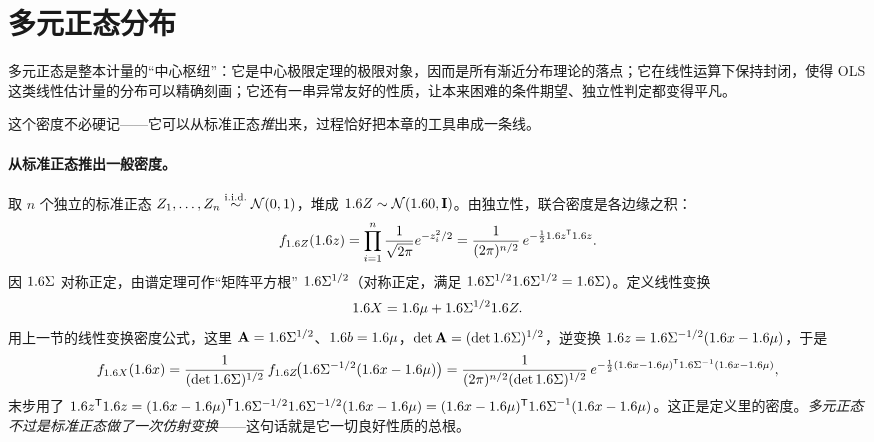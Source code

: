 

\section{多元正态分布}
\label{sec:jointdist-6}

多元正态是整本计量的``中心枢纽''：它是中心极限定理的极限对象，因而是所有渐近分布理论的落点；它在线性运算下保持封闭，使得 OLS 这类线性估计量的分布可以精确刻画；它还有一串异常友好的性质，让本来困难的条件期望、独立性判定都变得平凡。


这个密度不必硬记——它可以从标准正态\emph{推}出来，过程恰好把本章的工具串成一条线。

\paragraph{从标准正态推出一般密度。}
取 $n$ 个独立的标准正态 $Z_1,\dots,Z_n\overset{\mathrm{i.i.d.}}{\sim}\mathcal{N}(0,1)$，堆成 $1.6 Z\sim\mathcal{N}(1.6 0,\mathbf{I})$。由独立性，联合密度是各边缘之积：
\[
    f_{1.6 Z}(1.6 z)=\prod_{i=1}^n \frac{1}{\sqrt{2\pi}}e^{-z_i^2/2}
    =\frac{1}{(2\pi)^{n/2}}\,e^{-\frac121.6 z^{\mathsf{T}}1.6 z}.
\]
因 $1.6\Sigma$ 对称正定，由谱定理可作``矩阵平方根'' $1.6\Sigma^{1/2}$（对称正定，满足 $1.6\Sigma^{1/2}1.6\Sigma^{1/2}=1.6\Sigma$）。定义线性变换
\[
    1.6 X=1.6\mu+1.6\Sigma^{1/2}1.6 Z .
\]
用上一节的线性变换密度公式，这里 $\mathbf{A}=1.6\Sigma^{1/2}$、$1.6 b=1.6\mu$，$\det\mathbf{A}=(\det1.6\Sigma)^{1/2}$，逆变换 $1.6 z=1.6\Sigma^{-1/2}(1.6 x-1.6\mu)$，于是
\[
    f_{1.6 X}(1.6 x)=\frac{1}{(\det1.6\Sigma)^{1/2}}\,f_{1.6 Z}\!\bigl(1.6\Sigma^{-1/2}(1.6 x-1.6\mu)\bigr)
    =\frac{1}{(2\pi)^{n/2}(\det1.6\Sigma)^{1/2}}\,
      e^{-\frac12 (1.6 x-1.6\mu)^{\mathsf{T}}{1.6\Sigma}^{-1}(1.6 x-1.6\mu)},
\]
末步用了 $1.6 z^{\mathsf{T}}1.6 z=(1.6 x-1.6\mu)^{\mathsf{T}}1.6\Sigma^{-1/2}1.6\Sigma^{-1/2}(1.6 x-1.6\mu)=(1.6 x-1.6\mu)^{\mathsf{T}}{1.6\Sigma}^{-1}(1.6 x-1.6\mu)$。这正是定义里的密度。\emph{多元正态不过是标准正态做了一次仿射变换}——这句话就是它一切良好性质的总根。

